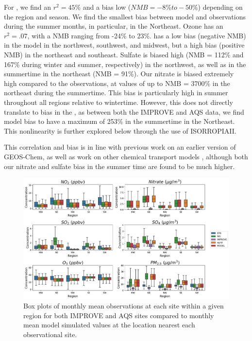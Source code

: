 \documentclass[12]{article}
\begin{document}
For , we find an $r^2 = 45\%$ and a bias low ($NMB = -8\% to -50\%$) depending on the region and season. We find the smallest bias between model  and observations during the summer months, in particular, in the Northeast. Ozone has an $r^2 = .07$, with a NMB ranging from -24\% to 23\%.  has a low bias (negative NMB) in the model in the northwest, southwest, and midwest, but a high bias (positive NMB) in the northeast and southeast. Sulfate is biased high (NMB = 112\% and 167\% during winter and summer, respectively) in the northwest, as well as in the summertime in the northeast (NMB = 91\%). Our nitrate is biased extremely high compared to the observations, at values of up to NMB = 3700\% in the northeast during the summertime. This bias is particularly high in summer throughout all regions relative to wintertime. However, this does not directly translate to bias in the , as between both the IMPROVE and AQS data, we find model bias to have a maximum of 253\% in the summertime in the Northeast. This nonlinearity is further explored below through the use of ISORROPIAII. 

This correlation and bias is in line with previous work \citep{holt_changes_2015} on an earlier version of GEOS-Chem, as well as work on other chemical transport models \citep{simon}, although both our nitrate and sulfate bias in the summer time are found to be much higher.

\begin{figure}
    \centering
    \includegraphics[scale=0.5]{model_validation/Figures/obs_boxplots.png}
    \caption{Box plots of monthly mean observations at each site within a given region for both IMPROVE and AQS sites compared to monthly mean model simulated values at the location nearest each observational site.} 
    \label{fig:obs_model}
\end{figure}
\end{document}
